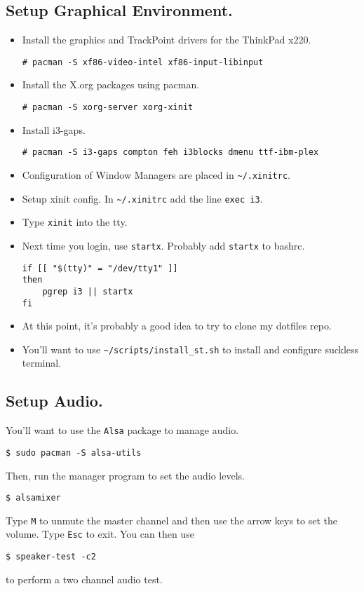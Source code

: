 \documentclass{article}
\begin{document}
  \subsection{Setup Graphical Environment.}
    \begin{itemize}
      \item Install the graphics and TrackPoint drivers for the ThinkPad x220.
\begin{verbatim}
# pacman -S xf86-video-intel xf86-input-libinput
\end{verbatim}
      \item Install the X.org packages using pacman.
\begin{verbatim}
# pacman -S xorg-server xorg-xinit
\end{verbatim}
      \item Install i3-gaps.
\begin{verbatim}
# pacman -S i3-gaps compton feh i3blocks dmenu ttf-ibm-plex
\end{verbatim}
      \item Configuration of Window Managers are placed in
        \verb|~/.xinitrc|.
      \item Setup xinit config. In \verb|~/.xinitrc| add the
        line \verb|exec i3|.
      \item Type \verb|xinit| into the tty.
      \item Next time you login, use \verb|startx|. Probably add
        \verb|startx| to bashrc.
\begin{verbatim}
if [[ "$(tty)" = "/dev/tty1" ]]
then
    pgrep i3 || startx
fi
\end{verbatim}
      \item At this point, it's probably a good idea to try to clone my dotfiles
        repo.
      \item You'll want to use \verb|~/scripts/install_st.sh| to install and configure suckless terminal.
    \end{itemize}

  \subsection{Setup Audio.}
    You'll want to use the \verb|Alsa| package to manage audio.
\begin{verbatim}
$ sudo pacman -S alsa-utils
\end{verbatim}
    Then, run the manager program to set the audio levels.
\begin{verbatim}
$ alsamixer
\end{verbatim}
    Type \verb|M| to unmute the master channel and then use the arrow keys to
    set the volume. Type \verb|Esc| to exit. You can then use 
\begin{verbatim}
$ speaker-test -c2
\end{verbatim}
    to perform a two channel audio test.
\end{document}
